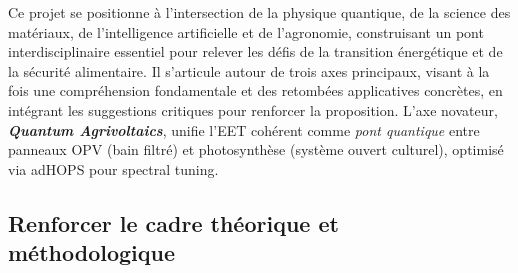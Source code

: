 \documentclass[12pt, a4paper]{article}
\begin{document}
Ce projet se positionne à l'intersection de la physique quantique, de la science des matériaux, de l'intelligence artificielle et de l'agronomie, construisant un pont interdisciplinaire essentiel pour relever les défis de la transition énergétique et de la sécurité alimentaire. Il s'articule autour de trois axes principaux, visant à la fois une compréhension fondamentale et des retombées applicatives concrètes, en intégrant les suggestions critiques pour renforcer la proposition. L'axe novateur, \textbf{\textit{Quantum Agrivoltaics}}, unifie l'EET cohérent comme \textit{pont quantique} entre panneaux OPV (bain filtré) et photosynthèse (système ouvert culturel), optimisé via adHOPS pour spectral tuning.

\subsection{Renforcer le cadre théorique et méthodologique}
\end{document}
